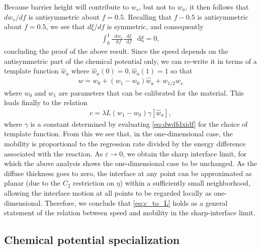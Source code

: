\documentclass[colorinlistoftodos,review]{elsarticle}
\newcommand*\diff{\mathop{}\!\mathrm{d}}
\begin{document}
Because barrier height will contribute to $w_s$, but not to $w_a$, it then follows that $dw_s/df$ is antisymmetric about $f=0.5$.
Recalling that $f-0.5$ is antisymmetric about $f=0.5$, we see that $d\xi/df$ is symmetric, and consequently
\begin{align}
  \int_0^1\frac{\diff w_s}{\diff f}\frac{\diff \xi}{\diff f}\,\diff \xi = 0,
\end{align}
concluding the proof of the above result.
Since the speed depends on the antisymmetric part of the chemical potential only, we can re-write it in terms of a template function $\hat{w}_a$ where $\hat{w}_a(0)=0, \hat{w}_a(1)=1$ so that 
\begin{align}
  w = w_0 + (w_1-w_0)\hat{w}_a + w_{1/2}w_s
\end{align}
where $w_0$ and $w_1$ are parameters that can be calibrated for the material.
This leads finally to the relation
\begin{align}\label{eq:c_to_L}
  c = \lambda L(w_1-w_0)\gamma[\hat{w}_a],
\end{align}
where $\gamma$ is a constant determined by evaluating \cref{eq:dwdfdxidf} for the choice of template function.
From this we see that, in the one-dimensional case, the mobility is proportional to the regression rate divided by the energy difference associated with the reaction.
As $\varepsilon\to0$, we obtain the sharp interface limit, for which the above analysis shows the one-dimensional case to be unchanged.
As the diffuse thickness goes to zero, the interface at any point can be approximated as planar (due to the $C_2$ restriction on $\eta$) within a sufficiently small neighborhood, allowing the interface motion at all points to be regarded locally as one-dimensional.
Therefore, we conclude that \cref{eq:c_to_L} holds as a general statement of the relation between speed and mobility in the sharp-interface limit.

\subsection{Chemical potential specialization}
\end{document}
